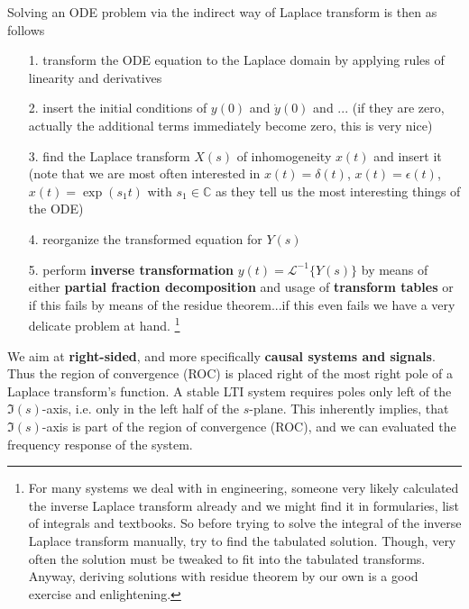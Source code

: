 \documentclass[11pt,a4paper,DIV=12]{scrartcl}
\begin{document}
Solving an ODE problem via the indirect way of Laplace transform is then as follows
\begin{itemize}
\item[1.] transform the ODE equation to the Laplace domain by applying rules of linearity and
derivatives
\item[2.] insert the initial conditions of $y(0)$  and $\dot{y}(0)$ and ...
(if they are zero, actually the additional terms immediately become zero,
this is very nice)
\item[3.] find the Laplace transform $X(s)$ of inhomogeneity $x(t)$ and insert
it (note that we are most often interested in $x(t)=\delta(t)$,
$x(t)=\epsilon(t)$, $x(t)=\exp(s_1 t)$ with $s_1\in\mathbb{C}$
as they tell us the most interesting things of the ODE)
\item[4.] reorganize the transformed equation for $Y(s)$
\item[5.] perform \textbf{inverse transformation} $y(t) = \mathcal{L}^{-1}\{Y(s)\}$
by means of either \textbf{partial fraction decomposition} and usage of
\textbf{transform tables}
or if this fails by means of the residue theorem...if this even fails we have a
very delicate problem at hand.
\footnote{For many systems we deal with in engineering,
someone very likely calculated the inverse Laplace transform already and we
might find it in formularies, list of integrals and textbooks.
So before trying to solve the integral of the inverse Laplace transform
manually, try to find the tabulated solution.
Though, very often the solution must be tweaked to fit into the tabulated
transforms.
Anyway, deriving solutions with residue theorem by our own is a
good exercise and enlightening.}
\end{itemize}

We aim at \textbf{right-sided}, and more specifically \textbf{causal systems and signals}.
Thus the region of convergence (ROC) is placed right of the most right pole of a
Laplace transform's function.
%
A stable LTI system requires poles only left of the $\Im(s)$-axis, i.e. only in
the left half of the $s$-plane.
%
This inherently implies, that $\Im(s)$-axis is part of the region of convergence (ROC),
and we can evaluated the frequency response of the system.

\end{document}
